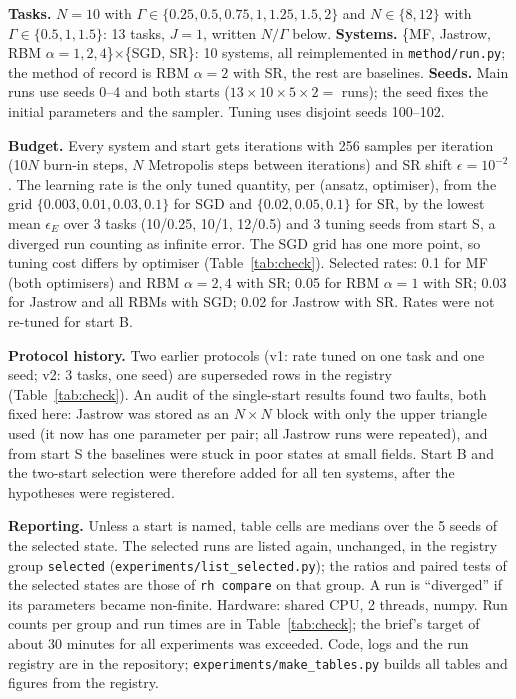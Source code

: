 \textbf{Tasks.} $N=10$ with $\Gamma\in\{0.25,0.5,0.75,1,1.25,1.5,2\}$ and $N\in\{8,12\}$ with $\Gamma\in\{0.5,1,1.5\}$: 13 tasks, $J=1$, written $N/\Gamma$ below. \textbf{Systems.} \{MF, Jastrow, RBM $\alpha=1,2,4$\}$\times$\{SGD, SR\}: 10 systems, all reimplemented in \texttt{method/run.py}; the method of record is RBM $\alpha{=}2$ with SR, the rest are baselines. \textbf{Seeds.} Main runs use seeds 0--4 and both starts ($13\times10\times5\times2=$  runs); the seed fixes the initial parameters and the sampler. Tuning uses disjoint seeds 100--102.

\textbf{Budget.} Every system and start gets  iterations with 256 samples per iteration (10$N$ burn-in steps, $N$ Metropolis steps between iterations) and SR shift $\epsilon=10^{-2}$. The learning rate is the only tuned quantity, per (ansatz, optimiser), from the grid $\{0.003,0.01,0.03,0.1\}$ for SGD and $\{0.02,0.05,0.1\}$ for SR, by the lowest mean $\epsilon_E$ over 3 tasks (10/0.25, 10/1, 12/0.5) and 3 tuning seeds from start S, a diverged run counting as infinite error. The SGD grid has one more point, so tuning cost differs by optimiser (Table~\ref{tab:check}). Selected rates: 0.1 for MF (both optimisers) and RBM $\alpha{=}2,4$ with SR; 0.05 for RBM $\alpha{=}1$ with SR; 0.03 for Jastrow and all RBMs with SGD; 0.02 for Jastrow with SR. Rates were not re-tuned for start B.

\textbf{Protocol history.} Two earlier protocols (v1: rate tuned on one task and one seed; v2: 3 tasks, one seed) are superseded rows in the registry (Table~\ref{tab:check}). An audit of the single-start results found two faults, both fixed here: Jastrow was stored as an $N{\times}N$ block with only the upper triangle used (it now has one parameter per pair; all Jastrow runs were repeated), and from start S the baselines were stuck in poor states at small fields. Start B and the two-start selection were therefore added for all ten systems, after the hypotheses were registered.

\textbf{Reporting.} Unless a start is named, table cells are medians over the 5 seeds of the selected state. The selected runs are listed again, unchanged, in the registry group \texttt{selected} (\texttt{experiments/list\_selected.py}); the ratios and paired tests of the selected states are those of \texttt{rh compare} on that group. A run is ``diverged'' if its parameters became non-finite. Hardware: shared CPU, 2 threads, numpy. Run counts per group and run times are in Table~\ref{tab:check}; the brief's target of about 30 minutes for all experiments was exceeded. Code, logs and the run registry are in the repository; \texttt{experiments/make\_tables.py} builds all tables and figures from the registry.

